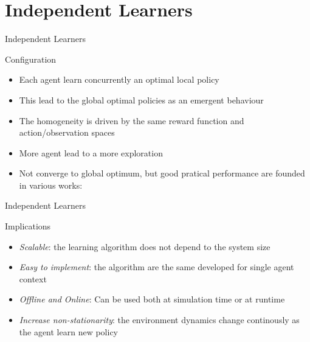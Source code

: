 \documentclass[presentation]{beamer}\mode<presentation>{\usetheme{AMSBolognaFC}}
\begin{document}
\section{Independent Learners}
\begin{frame}{Independent Learners}
	\begin{exampleblock}{Configuration}
		\begin{itemize}
			\item Each agent learn concurrently an optimal local policy
			\item This lead to the global optimal policies as an emergent behaviour
			\item The homogeneity is driven by the same reward function and action/observation spaces
			\item More agent lead to a more exploration
			\item Not converge to global optimum, but good pratical performance are founded in various works: \cite{DBLP:conf/atal/TumerA07, DBLP:conf/atal/TumerAW02, DBLP:conf/iros/WangS06}
		\end{itemize}
	\end{exampleblock}
\end{frame}
\begin{frame}{Independent Learners}
	\begin{exampleblock}{Implications}
		\begin{itemize}
			\item [{\color{teal} \faThumbsUp}] \emph{Scalable}: the learning algorithm does not depend to the system size
			\item [{\color{teal} \faThumbsUp}] \emph{Easy to implement}: the algorithm are the same developed for single agent context
			\item [{\color{teal} \faThumbsUp}] \emph{Offline and Online}: Can be used both at simulation time or at runtime
			\item [{\color{red} \faThumbsDown}] \emph{Increase non-stationarity}: the environment dynamics change continously as the agent learn new policy
		\end{itemize}
	\end{exampleblock}
\end{frame}
\end{document}
